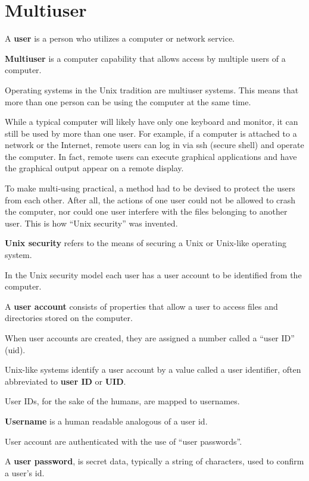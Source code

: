 \section{Multiuser}

\bd[User]
A \textbf{user} is a person who utilizes a computer or network service.
\ed

\bd[Multiuser]
\textbf{Multiuser} is a computer capability that allows access by multiple users of a computer.
\ed

Operating systems in the Unix tradition are multiuser systems. This means that more than one person can be using the
computer at the same time.

\be
While a typical computer will likely have only one keyboard and monitor, it can still be used by more than one user.
For example, if a computer is attached to a network or the Internet, remote users can log in via ssh (secure shell)
and operate the computer. In fact, remote users can execute graphical applications and have the graphical output
appear on a remote display.
\ee

To make multi-using practical, a method had to be devised to protect the users from each other. After all, the
actions of one user could not be allowed to crash the computer, nor could one user interfere with the files belonging
to another user. This is how ``Unix security'' was invented.

\textbf{Unix security} refers to the means of securing a Unix or Unix-like operating system.
\ed

In the Unix security model each user has a user account to be identified from the computer.

A \textbf{user account} consists of properties that allow a user to access files and directories stored on the computer.
\ed

When user accounts are created, they are assigned a number called a ``user ID'' (uid).

Unix-like systems identify a user account by a value called a user identifier, often abbreviated to \textbf{user ID} or
\textbf{UID}.
\ed

User IDs, for the sake of the humans, are mapped to usernames.

\bd[Username]
\textbf{Username} is a human readable analogous of a user id.
\ed

User account are authenticated with the use of ``user passwords''.

A \textbf{user password}, is secret data, typically a string of characters, used to confirm a user's id.
\ed

